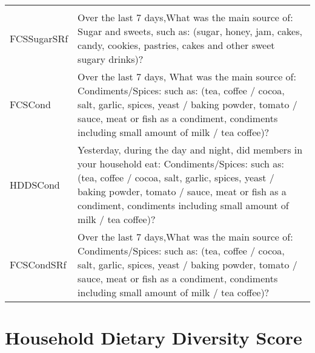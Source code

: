 \documentclass[
]{article}
\begin{document}
\begin{longtable}[]{@{}ll@{}}
\begin{minipage}[t]{0.72\columnwidth}
\end{minipage}\tabularnewline
\begin{minipage}[t]{0.22\columnwidth}\raggedright
FCSSugarSRf\strut
\end{minipage} & \begin{minipage}[t]{0.72\columnwidth}\raggedright
Over the last 7 days,What was the main source of: Sugar and sweets, such as: (sugar, honey, jam, cakes, candy, cookies, pastries, cakes and other sweet sugary drinks)?\strut
\end{minipage}\tabularnewline
\begin{minipage}[t]{0.22\columnwidth}\raggedright
FCSCond\strut
\end{minipage} & \begin{minipage}[t]{0.72\columnwidth}\raggedright
Over the last 7 days, What was the main source of: Condiments/Spices: such as: (tea, coffee / cocoa, salt, garlic, spices, yeast / baking powder, tomato / sauce, meat or fish as a condiment, condiments including small amount of milk / tea coffee)?\strut
\end{minipage}\tabularnewline
\begin{minipage}[t]{0.22\columnwidth}\raggedright
HDDSCond\strut
\end{minipage} & \begin{minipage}[t]{0.72\columnwidth}\raggedright
Yesterday, during the day and night, did members in your household eat: Condiments/Spices: such as: (tea, coffee / cocoa, salt, garlic, spices, yeast / baking powder, tomato / sauce, meat or fish as a condiment, condiments including small amount of milk / tea coffee)?\strut
\end{minipage}\tabularnewline
\begin{minipage}[t]{0.22\columnwidth}\raggedright
FCSCondSRf\strut
\end{minipage} & \begin{minipage}[t]{0.72\columnwidth}\raggedright
Over the last 7 days,What was the main source of: Condiments/Spices: such as: (tea, coffee / cocoa, salt, garlic, spices, yeast / baking powder, tomato / sauce, meat or fish as a condiment, condiments including small amount of milk / tea coffee)?\strut
\end{minipage}\tabularnewline
\bottomrule
\end{longtable}

\hypertarget{household-dietary-diversity-score}{%
\section{Household Dietary Diversity Score}\label{household-dietary-diversity-score}}
\end{document}

